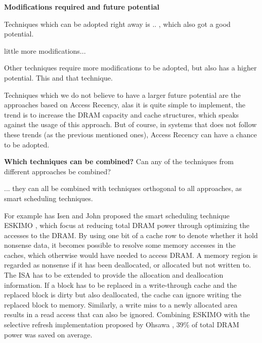 \textbf{Modifications required and future potential}


Techniques which can be adopted right away is .. , which also got a good potential.

little more modifications...

Other techniques require more modifications to be adopted, but also has a higher potential. This and that technique.

Techniques which we do not believe to have a larger future potential are the approaches based on Access Recency, alas it is quite simple to implement, the trend is to increase the DRAM capacity and cache structures, which speaks against the usage of this approach. But of course, in systems that does not follow these trends (as the previous mentioned ones), Access Recency can have a chance to be adopted. 


\textbf{Which techniques can be combined?}
Can any of the techniques from different approaches be combined?

... they can all be combined with techniques orthogonal to all approaches, as smart scheduling techniques.

For example has Isen and John proposed the smart scheduling technique ESKIMO \cite{eskimo}, which focus at reducing total DRAM power through optimizing the accesses to the DRAM. By using one bit of a cache row to denote whether it hold nonsense data, it becomes possible to resolve some memory accesses in the caches, which otherwise would have needed to access DRAM. A memory region is regarded as nonsense if it has been deallocated, or allocated but not written to. The ISA has to be extended to provide the allocation and deallocation information. If a block has to be replaced in a write-through cache and the replaced block is dirty but also deallocated, the cache can ignore writing the replaced block to memory. Similarly, a write miss to a newly allocated area results in a read access that can also be ignored. Combining ESKIMO with the selective refresh implementation proposed by Ohsawa \cite{ohsawa}, $39\%$ of total DRAM power was saved on average.